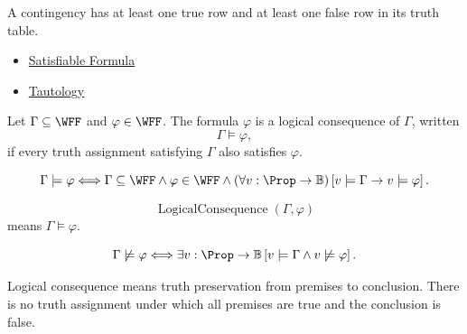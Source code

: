 \begin{remark*}[Interpretation]
A contingency has at least one true row and at least one false row in its truth table.
\end{remark*}

\begin{dependencies}
\begin{itemize}
  \item \hyperref[def:satisfiable-formula-propositional-logic]{Satisfiable Formula}
  \item \hyperref[def:tautology-propositional-logic]{Tautology}
\end{itemize}
\end{dependencies}
\begin{tcolorbox}[colback=propbox, colframe=propborder, arc=2pt,
  left=6pt, right=6pt, top=4pt, bottom=4pt,
  title={\small\textbf{Definition (Logical Consequence)}},
  fonttitle=\small\bfseries]
\begin{definition}
\label{def:logical-consequence-propositional-logic}
Let \(\Gamma\subseteq\WFF\) and \(\varphi\in\WFF\). The formula \(\varphi\) is a logical consequence of \(\Gamma\), written
\[
\Gamma\models\varphi,
\]
if every truth assignment satisfying \(\Gamma\) also satisfies \(\varphi\).
\end{definition}
\end{tcolorbox}

\begin{remark*}
\[
\Gamma\models\varphi
\Longleftrightarrow
\Gamma\subseteq\WFF
\land
\varphi\in\WFF
\land
(\forall v:\Prop\to\mathbb{B})
\left[
v\models\Gamma\to v\models\varphi
\right].
\]
\end{remark*}

\begin{remark*}
\[
\operatorname{LogicalConsequence}(\Gamma,\varphi)
\]
means \(\Gamma\models\varphi\).
\end{remark*}

\begin{remark*}
\[
\Gamma\not\models\varphi
\Longleftrightarrow
\exists v:\Prop\to\mathbb{B}
\left[
v\models\Gamma
\land
v\not\models\varphi
\right].
\]
\end{remark*}

\begin{remark*}[Interpretation]
Logical consequence means truth preservation from premises to conclusion. There is no truth assignment under which all premises are true and the conclusion is false.
\end{remark*}

